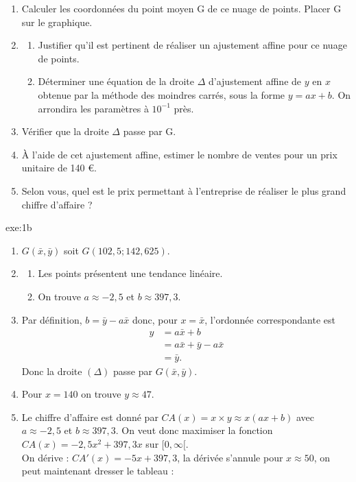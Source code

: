 {\begin{enumerate}
  \item Calculer les coordonnées du point moyen G de ce nuage de points. Placer G sur le graphique.
  \item \begin{enumerate}
	 \item Justifier qu'il est pertinent de réaliser un ajustement affine pour ce nuage de points.
	 \item Déterminer une équation de la droite $\Delta$ d'ajustement affine de $y$ en $x$ obtenue par la méthode des moindres carrés, sous la forme $y=ax+b$.
	 On arrondira les paramètres à $10^{-1}$ près.
	\end{enumerate}
	\item Vérifier que la droite $\Delta$ passe par G.
	\item À l'aide de cet ajustement affine, estimer le nombre de ventes pour un prix unitaire de 140 \euro.
	\item Selon vous, quel est le prix permettant à l'entreprise de réaliser le plus grand chiffre d'affaire ?
 \end{enumerate}
}{exe:1b}{
\begin{enumerate}
  \item $G(\bar{x}, \bar{y})$ soit $G(102,5 ; 142,625)$.
  \item \begin{enumerate}
	 \item Les points présentent une tendance linéaire.
	 \item On trouve $a \approx -2,5$ et $b \approx 397,3$.
	\end{enumerate}
	\item Par définition, $b = \bar{y} - a \bar{x}$ donc, pour $x = \bar{x}$, l'ordonnée correspondante est 
	\begin{align*}
	y & = a \bar{x} + b \\
	& = a \bar{x} + \bar{y} - a \bar{x} \\
	& = \bar{y} .
	\end{align*}
	Donc la droite $(\Delta)$ passe par $G(\bar{x}, \bar{y})$.
	\item Pour $x = 140$ on trouve $y \approx 47$.
	\item Le chiffre d'affaire est donné par $CA(x) = x \times y \approx x(ax+b)$ avec $a \approx -2,5$ et $b \approx 397,3$.
	On veut donc maximiser la fonction $CA(x) = -2,5x^2 + 397,3 x$ sur $[0, \infty[$. \\
	On dérive : $CA'(x) = -5x + 397,3$, la dérivée s'annule pour $x \approx 50$, on peut maintenant dresser le tableau :


\end{enumerate}}

